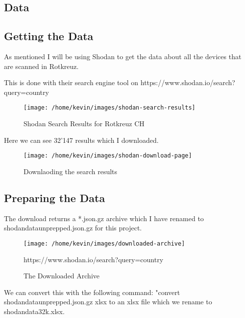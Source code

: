 \documentclass[11pt,a4paper]{article}
\begin{document}
\begin{data}
\section{Data}
\subsection{Getting the Data}

As mentioned I will be using Shodan to get the data about all the devices that are scanned in Rotkreuz.

This is done with their search engine tool on https://www.shodan.io/search?query=country%

\begin{figure}[!htb]
    \centering
    \texttt{[image: /home/kevin/images/shodan-search-results]}
    \caption{Shodan Search Results for Rotkreuz CH}
    \label{fig:shodan-search-results}
\end{figure}

Here we can see 32'147 results which I downloaded.

\begin{figure}[!htb]
    \centering
    \texttt{[image: /home/kevin/images/shodan-download-page]}
    \caption{Downlaoding the search results}
    \label{fig:shodan-download-page}
\end{figure}


\subsection{Preparing the Data}

The download returns a *.json.gz archive which I have renamed to shodan\textbf{\textunderscore}data\textbf{\textunderscore}unprepped.json.gz for this project.

\begin{figure}[!htb]
    \centering
    \texttt{[image: /home/kevin/images/downloaded-archive]}
    \caption{The Downloaded Archive}
    \label{fig:downloaded-archive}https://www.shodan.io/search?query=country%
\end{figure}

We can convert this with the following command: "convert shodan\textbf{\textunderscore}data\textbf{\textunderscore}unprepped.json.gz xlsx to an xlsx file which we rename to shodan\textbf{\textunderscore}data\textbf{\textunderscore}32k.xlsx.



\end{data}
\end{document}
